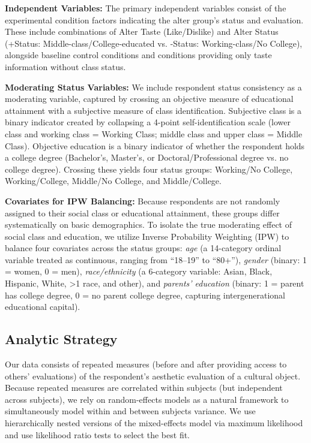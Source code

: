 \documentclass[12pt, letterpaper]{article}
\begin{document}
\textbf{Independent Variables:} The primary independent variables consist of the experimental condition factors indicating the alter group's status and evaluation. These include combinations of Alter Taste (Like/Dislike) and Alter Status (+Status: Middle-class/College-educated vs. -Status: Working-class/No College), alongside baseline control conditions and conditions providing only taste information without class status. 

\textbf{Moderating Status Variables:} We include respondent status consistency as a moderating variable, captured by crossing an objective measure of educational attainment with a subjective measure of class identification. Subjective class is a binary indicator created by collapsing a 4-point self-identification scale (lower class and working class = Working Class; middle class and upper class = Middle Class). Objective education is a binary indicator of whether the respondent holds a college degree (Bachelor's, Master's, or Doctoral/Professional degree vs. no college degree). Crossing these yields four status groups: Working/No College, Working/College, Middle/No College, and Middle/College.

\textbf{Covariates for IPW Balancing:} Because respondents are not randomly assigned to their social class or educational attainment, these groups differ systematically on basic demographics. To isolate the true moderating effect of social class and education, we utilize Inverse Probability Weighting (IPW) to balance four covariates across the status groups: \textit{age} (a 14-category ordinal variable treated as continuous, ranging from ``18--19'' to ``80+''), \textit{gender} (binary: 1 = women, 0 = men), \textit{race/ethnicity} (a 6-category variable: Asian, Black, Hispanic, White, >1 race, and other), and \textit{parents' education} (binary: 1 = parent has college degree, 0 = no parent college degree, capturing intergenerational educational capital).

\subsection{Analytic Strategy}
Our data consists of repeated measures (before and after providing access to others' evaluations) of the respondent’s aesthetic evaluation of a cultural object. Because repeated measures are correlated within subjects (but independent across subjects), we rely on random-effects models as a natural framework to simultaneously model within and between subjects variance. We use hierarchically nested versions of the mixed-effects model via maximum likelihood and use likelihood ratio tests to select the best fit.
\end{document}
